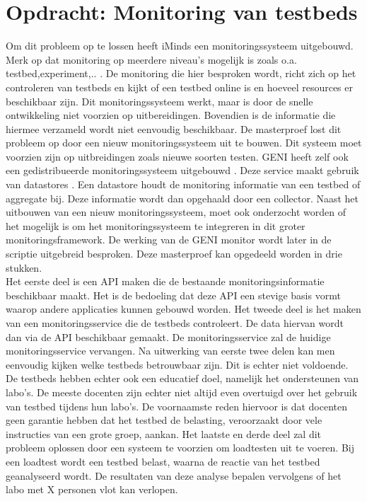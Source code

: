 \section{Opdracht: Monitoring van testbeds}
\npar
Om dit probleem op te lossen heeft iMinds een monitoringssysteem uitgebouwd\citep{fed4fire-second-fed-arch}. Merk op dat monitoring op meerdere niveau's mogelijk is zoals o.a. testbed,experiment,.. . De monitoring die hier besproken wordt, richt zich op het controleren van testbeds en kijkt of een testbed online is en hoeveel resources er beschikbaar zijn. 
\npar
Dit monitoringssysteem werkt, maar is door de snelle ontwikkeling niet voorzien op uitbereidingen. Bovendien is de informatie die hiermee verzameld wordt niet eenvoudig beschikbaar. De masterproef lost dit probleem op door een nieuw monitoringssysteem uit te bouwen. Dit systeem moet voorzien zijn op uitbreidingen zoals nieuwe soorten testen.
\npar
GENI heeft zelf ook een gedistribueerde monitoringssysteem uitgebouwd \citep{geni-monitor}. Deze service maakt gebruik van datastores \citep{geni-overview}. Een datastore houdt de monitoring informatie van een testbed of aggregate bij. Deze informatie wordt dan opgehaald door een collector. Naast het uitbouwen van een nieuw monitoringssysteem, moet ook onderzocht worden of het mogelijk is om het monitoringssysteem te integreren in dit groter monitoringsframework. De werking van de GENI monitor wordt later in de scriptie uitgebreid besproken.
\npar
Deze masterproef kan opgedeeld worden in drie stukken. \\
Het eerste deel is een API maken die de bestaande monitoringsinformatie beschikbaar maakt. Het is de bedoeling dat deze API een stevige basis vormt waarop andere applicaties kunnen gebouwd worden.
\npar
Het tweede deel is het maken van een monitoringsservice die de testbeds controleert. De data hiervan wordt dan via de API beschikbaar gemaakt. De monitoringsservice zal de huidige monitoringsservice vervangen.
\npar
Na uitwerking van eerste twee delen kan men eenvoudig kijken welke testbeds betrouwbaar zijn. Dit is echter niet voldoende. De testbeds hebben echter ook een educatief doel, namelijk het ondersteunen van labo's. De meeste docenten zijn echter niet altijd even overtuigd over het gebruik van testbed tijdens hun labo's. De voornaamste reden hiervoor is dat docenten geen garantie hebben dat het testbed de belasting, veroorzaakt door vele instructies van een grote groep, aankan. 
\npar
Het laatste en derde deel zal dit probleem oplossen door een systeem te voorzien om loadtesten uit te voeren. Bij een loadtest wordt een testbed belast, waarna de reactie van het testbed geanalyseerd wordt. De resultaten van deze analyse bepalen vervolgens of het labo met X personen vlot kan verlopen.